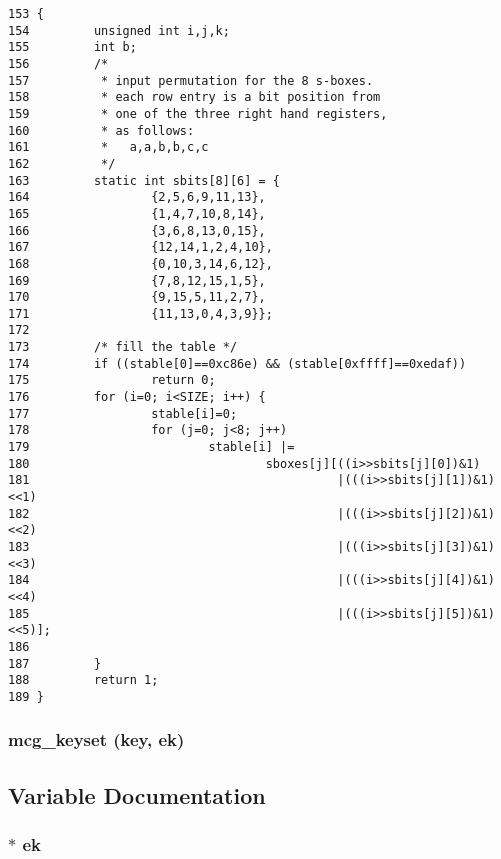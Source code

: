 \footnotesize\begin{verbatim}153 {
154         unsigned int i,j,k;
155         int b;
156         /*
157          * input permutation for the 8 s-boxes.
158          * each row entry is a bit position from
159          * one of the three right hand registers,
160          * as follows:
161          *   a,a,b,b,c,c
162          */
163         static int sbits[8][6] = {
164                 {2,5,6,9,11,13},
165                 {1,4,7,10,8,14},
166                 {3,6,8,13,0,15},
167                 {12,14,1,2,4,10},
168                 {0,10,3,14,6,12},
169                 {7,8,12,15,1,5},
170                 {9,15,5,11,2,7},
171                 {11,13,0,4,3,9}};
172 
173         /* fill the table */
174         if ((stable[0]==0xc86e) && (stable[0xffff]==0xedaf))
175                 return 0;
176         for (i=0; i<SIZE; i++) {
177                 stable[i]=0;
178                 for (j=0; j<8; j++)
179                         stable[i] |=
180                                 sboxes[j][((i>>sbits[j][0])&1)
181                                           |(((i>>sbits[j][1])&1)<<1)
182                                           |(((i>>sbits[j][2])&1)<<2)
183                                           |(((i>>sbits[j][3])&1)<<3)
184                                           |(((i>>sbits[j][4])&1)<<4)
185                                           |(((i>>sbits[j][5])&1)<<5)];
186                 
187         }
188         return 1;
189 }
\end{verbatim}\normalsize 
{}
\subsubsection{\setlength{\rightskip}{0pt plus 5cm}mcg\_\-keyset ({\bf key}, {\bf ek})}\label{mcgsbox_8c_a6}




\subsection{Variable Documentation}
\subsubsection{$\ast$ {\bf ek}}\label{mcgsbox_8c_a4}





